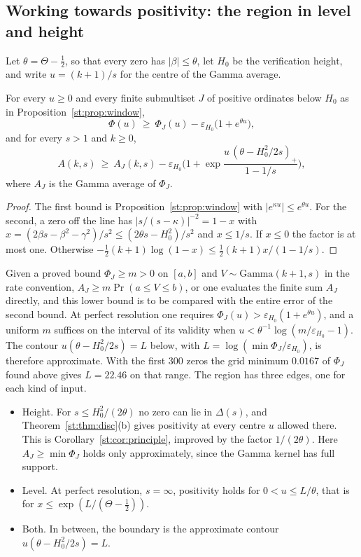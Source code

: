 \subsection{Working towards positivity: the region in level and height}
Let $\theta=\Theta-\tfrac12$, so that every zero has $|\beta|\le\theta$, let $H_0$ be the verification height, and write $u=(k+1)/s$ for the centre of the Gamma average.
\begin{theorem}\label{st:thm:region}
For every $u\ge0$ and every finite submultiset $J$ of positive ordinates below $H_0$ as in Proposition~\ref{st:prop:window},
\[
\Phi(u)\ \ge\ \Phi_J(u)-\varepsilon_{H_0}\big(1+e^{\theta u}\big),
\]
and for every $s>1$ and $k\ge0$,
\[
A(k,s)\ \ge\ A_J(k,s)-\varepsilon_{H_0}\Big(1+\exp\frac{u\,(\theta-H_0^2/2s)_+}{1-1/s}\Big),
\]
where $A_J$ is the Gamma average of $\Phi_J$.
\end{theorem}
\begin{proof}
The first bound is Proposition~\ref{st:prop:window} with $|e^{\kappa u}|\le e^{\theta u}$. For the second, a zero off the line has $|s/(s-\kappa)|^{-2}=1-x$ with $x=(2\beta s-\beta^2-\gamma^2)/s^2\le(2\theta s-H_0^2)/s^2$ and $x\le1/s$. If $x\le0$ the factor is at most one. Otherwise $-\tfrac12(k+1)\log(1-x)\le\tfrac12(k+1)x/(1-1/s)$.
\end{proof}
Given a proved bound $\Phi_J\ge m>0$ on $[a,b]$ and $V\sim\mathrm{Gamma}(k+1,s)$ in the rate convention, $A_J\ge m\Pr(a\le V\le b)$, or one evaluates the finite sum $A_J$ directly, and this lower bound is to be compared with the entire error of the second bound. At perfect resolution one requires $\Phi_J(u)>\varepsilon_{H_0}(1+e^{\theta u})$, and a uniform $m$ suffices on the interval of its validity when $u<\theta^{-1}\log(m/\varepsilon_{H_0}-1)$. The contour $u(\theta-H_0^2/2s)=L$ below, with $L=\log(\min\Phi_J/\varepsilon_{H_0})$, is therefore approximate. With the first 300 zeros the grid minimum $0.0167$ of $\Phi_J$ found above gives $L=22.46$ on that range. The region has three edges, one for each kind of input.
\begin{itemize}
\item Height. For $s\le H_0^2/(2\theta)$ no zero can lie in $\Delta(s)$, and Theorem~\ref{st:thm:disc}(b) gives positivity at every centre $u$ allowed there. This is Corollary~\ref{st:cor:principle}, improved by the factor $1/(2\theta)$. Here $A_J\ge\min\Phi_J$ holds only approximately, since the Gamma kernel has full support.
\item Level. At perfect resolution, $s=\infty$, positivity holds for $0<u\le L/\theta$, that is for $x\le\exp(L/(\Theta-\tfrac12))$.
\item Both. In between, the boundary is the approximate contour $u(\theta-H_0^2/2s)=L$.
\end{itemize}

